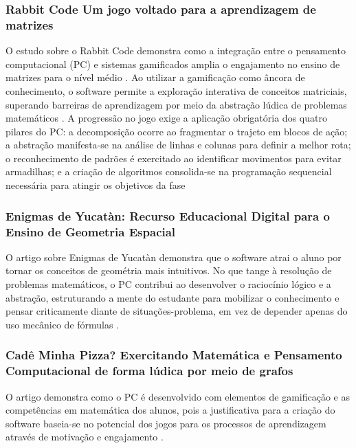 \documentclass[12pt]{article}
\begin{document}
\subsubsection{Rabbit Code Um jogo voltado para a aprendizagem de matrizes}
O estudo sobre o Rabbit Code demonstra como a integração entre o pensamento computacional (PC) e sistemas gamificados amplia o engajamento no ensino de matrizes para o nível médio \cite{rolim2023rabbit}. Ao utilizar a gamificação como âncora de conhecimento, o software permite a exploração interativa de conceitos matriciais, superando barreiras de aprendizagem por meio da abstração lúdica de problemas matemáticos \cite{rolim2023rabbit}. A progressão no jogo exige a aplicação obrigatória dos quatro pilares do PC: a decomposição ocorre ao fragmentar o trajeto em blocos de ação; a abstração manifesta-se na análise de linhas e colunas para definir a melhor rota; o reconhecimento de padrões é exercitado ao identificar movimentos para evitar armadilhas; e a criação de algoritmos consolida-se na programação sequencial necessária para atingir os objetivos da fase \cite{rolim2023rabbit}

\subsubsection{Enigmas de Yucatàn: Recurso Educacional Digital para o Ensino de Geometria Espacial}

O artigo sobre Enigmas de Yucatàn  demonstra que o software atrai o aluno por tornar os conceitos de geométria mais intuitivos. No que tange à resolução de problemas matemáticos, o PC contribui ao desenvolver o raciocínio lógico e a abstração, estruturando a mente do estudante para mobilizar o conhecimento e pensar criticamente diante de situações-problema, em vez de depender apenas do uso mecânico de fórmulas \cite{queiros2022enigmas}. 

\subsubsection{Cadê Minha Pizza? Exercitando Matemática e Pensamento Computacional de forma lúdica por meio de grafos}

O artigo demonstra como o PC é desenvolvido com elementos de gamificação e as competências em matemática dos alunos, pois a justificativa para a criação do software baseia-se no potencial dos jogos para os processos de aprendizagem através de motivação e engajamento \cite{honda2023cade}.
\end{document}
